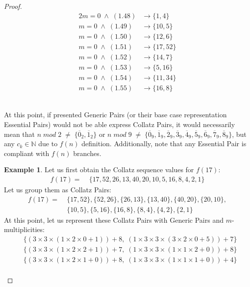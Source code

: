\documentclass{jams-l}
\theoremstyle{definition}
\newtheorem{example}[theorem]{Example}
\theoremstyle{remark}
\numberwithin{equation}{section}
\begin{document}
\begin{proof}
\begin{minipage}[b]{.47\textwidth}
\begin{alignat}{2}
    				m = 0\;\land\;(1.48) &\rightarrow \{1, 4\}\\
    				m = 0\;\land\;(1.49) &\rightarrow \{10, 5\}\\
    				m = 0\;\land\;(1.50) &\rightarrow \{12, 6\}\\
    				m = 0\;\land\;(1.51) &\rightarrow \{17, 52\}\\
    				m = 0\;\land\;(1.52) &\rightarrow \{14, 7\}\\
    				m = 0\;\land\;(1.53) &\rightarrow \{5, 16\}\\
    				m = 0\;\land\;(1.54) &\rightarrow \{11, 34\}\\
    				m = 0\;\land\;(1.55) &\rightarrow \{16, 8\}
    			\end{alignat}
    		\end{minipage}
    		\\At this point, if presented Generic Pairs (or their base case representation Essential Pairs) would not be able express Collatz Pairs, it would necessarily mean that $n\;mod\;2\;\neq\;\{\overline{0}_2, \overline{1}_2\}$ or $n\;mod\;9\;\neq\;\{\overline{0}_9, \overline{1}_9, \overline{2}_9, \overline{3}_9, \overline{4}_9, \overline{5}_9, \overline{6}_9, \overline{7}_9, \overline{8}_9\}$, but any $c_{k} \in \mathbb{N}$ due to $f(n)$ definition. Additionally, note that any Essential Pair is compliant with $f(n)$ branches.
    		\begin{example}
    			Let us first obtain the Collatz sequence values for $f(17)$:
    			\begin{align}	
    				f(17)=&\;\{17, 52, 26, 13, 40, 20, 10, 5, 16, 8, 4, 2, 1\}
    			\end{align}
       			Let us group them as Collatz Pairs:
    			\begin{align}	
    				f(17)=&\;\{17,52\},\{52, 26\},\{26, 13\},\{13, 40\},\{40, 20\},\{20, 10\}, \\&\nonumber \;\{10,5\},\{5, 16\},\{16, 8\},\{8, 4\},\{4, 2\},\{2, 1\}
    			\end{align}
    			At this point, let us represent these Collatz Pairs with Generic Pairs and $m$-multiplicities:
    			\begin{align}	
    				&\{{(3\times3\times(1\times2\times0+1))+8,\;(1\times3\times3\times(3\times2\times0+5))+7}\}\\
    				&\{{(3\times3\times(1\times2\times2+1))+7,\;(1\times3\times3\times(1\times1\times2+0))+8}\}\\
    				&\{{(3\times3\times(1\times2\times1+0))+8,\;(1\times3\times3\times(1\times1\times1+0))+4}\}\\

\end{align}
\end{example}
\end{proof}
\end{document}
